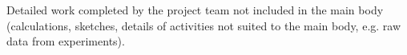 Detailed work completed by the project team not included in the main body (calculations, sketches, details of activities not suited to the main body, e.g. raw data from experiments).